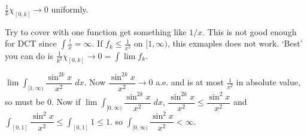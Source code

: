 \begin{ex}
$\frac{1}{k} \chi_{[0,k]} \to 0$ uniformly. 


Try to cover with one function get something like $1/x$. This is not good enough for DCT since $\int \frac{!}{x}= \infty$. If $f_k \leq \frac{1}{x^2}$ on $[1,\infty)$, this exmaples does not work. `Best' you can do is $\frac{1}{k^2} \chi_{[0,k]} \to 0= \int \lim f_k$. 
\end{ex}


\begin{ex}
$\lim \int_{[1,\infty)} \dfrac{\sin^{2k} x}{x^2} \; dx$. Now $\dfrac{\sin^{2k} x}{x^2} \to 0$ a.e. and is at most $\frac{1}{x^2}$ in absolute value, so must be 0. Now if $\lim \int_{[0,\infty)} \dfrac{\sin^{2k} x}{x^2} \; dx$, $\dfrac{\sin^{2k} x}{x^2} \leq \dfrac{\sin^2 x}{x^2}$ and $\int_{[0,1]} \dfrac{\sin^2 x}{x^2} \leq \int_{[0,1]} 1 \leq 1$. so $\int_{[0,\infty)} \dfrac{\sin^2 x}{x^2}< \infty$.
\end{ex}



































